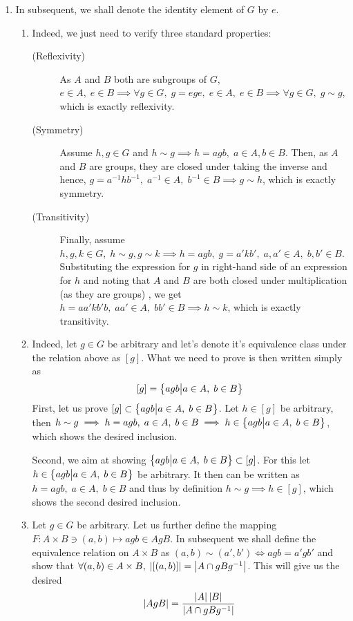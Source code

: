 \documentclass[8pt]{article} %
\title{}
\author{Igor Tereshkov}
\begin{document}
\maketitle
\begin{enumerate}[label=\bfseries Problem \arabic*.]
	\item{In subsequent, we shall denote the identity element of $G$ by $e$.
		\begin{enumerate}[label=(\arabic*)]
			\item{Indeed, we just need to verify three standard properties:
				\begin{description}
					\item[(Reflexivity)]{As $A$ and $B$ both are subgroups of $G$, $e\in A,\;e\in B\implies
						\forall g\in G,\; g=ege,\;e\in A,\;e\in B\implies \forall g\in G,\; g\sim g$,
						which is exactly reflexivity.}
					\item[(Symmetry)]{Assume $h,g\in G$ and $h\sim g\implies h=agb,\;a\in A,b\in B$. 
						Then, as $A$ and $B$ are groups, they are
						closed under taking the inverse and hence, $g=a^{-1}hb^{-1},\;a^{-1}\in A,\;b^{-1}\in
						B\implies g\sim h$, which is exactly symmetry.}
					\item[(Transitivity)]{Finally, assume $h,g,k\in G,\; h\sim g,g\sim k\implies
						h=agb,\;g=a'kb',\;a,a'\in A,\;b,b'\in B$. Substituting
						the expression for $g$ in right-hand
						side of an expression for $h$ and noting
						that $A$ and $B$ are both closed under multiplication (as they are groups)
						, we get $h=aa'kb'b,\;aa'\in A,\;bb'\in B\implies
						h\sim k$, which is exactly transitivity.}
				\end{description}
				}
			\item{Indeed, let $g\in G$ be arbitrary and let's denote it's equivalence class under the relation above
				as $[g]$. What we need to prove is then written simply as
				\[[g]=\left\{agb\big| a\in A,\;b\in B\right\}\]
				First, let us prove $[g]\subset \left\{agb\big| a\in A,\;b\in B\right\}$. Let $h\in[g]$ be arbitrary,
				then $h\sim g\implies h=agb,\;a\in A,\;b\in B\implies h\in\left\{agb\big| a\in A,\;b\in B\right\}$, which
				shows the desired inclusion.

				Second, we aim at showing $\left\{agb\big| a\in A,\;b\in B\right\}\subset [g]$. For this let
				$h\in\left\{agb\big| a\in A,\;b\in B\right\}$ be arbitrary. It then can be written as $h=agb,\;a\in A,\;b\in B$
				and thus by definition $h\sim g\implies h\in [g]$, which shows the second desired inclusion.
				}
			\item{Let $g\in G$ be arbitrary. Let us further define the mapping $F:A\times B\ni(a,b)\mapsto agb\in AgB$. In subsequent we shall define the 
				equivalence relation on $A\times B$ as $(a,b)\sim (a',b')\iff agb=a'gb'$ and show that $\forall (a,b)\in A\times B,\;\left|[(a,b)]\right|=
				\left|A\cap gBg^{-1}\right|$. This will give us the desired
				\[\left|AgB\right|=\frac{\left|A\right|\left|B\right|}{\left|A\cap gBg^{-1}\right|}\]

}
\end{enumerate}}
\end{enumerate}
\end{document}
